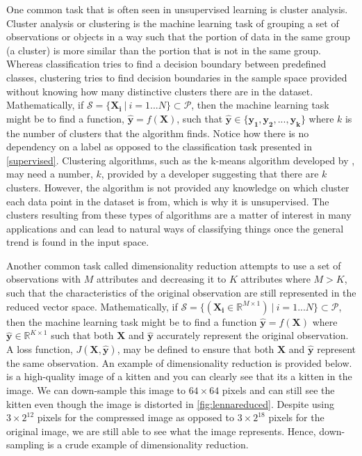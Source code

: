 One common task that is often seen in unsupervised learning is cluster analysis. Cluster analysis or clustering is the machine learning task of grouping a set of observations or objects in a way such that the portion of data in the same group (a cluster) is more similar than the portion that is not in the same group. Whereas classification tries to find a decision boundary between predefined classes, clustering tries to find decision boundaries in the sample space provided without knowing how many distinctive clusters there are in the dataset. Mathematically, if $\mathcal{S} =\{  \mathbf{X_i} \ | \ i = 1...N\} \subset \mathcal{P}$, then the machine learning task might be to find a function, $\mathbf{\hat{y}} = f(\mathbf{X})$, such that $\mathbf{\hat{y}} \in \{\mathbf{y_1}, \mathbf{y_2}, ...,\mathbf{y_k}\}$ where $k$ is the number of clusters that the algorithm finds. Notice how there is no dependency on a label as opposed to the classification task presented in \cref{supervised}. Clustering algorithms, such as the k-means algorithm developed by \citet{macqueen1967some}, may need a number, $k$, provided by a developer suggesting that there are $k$ clusters. However, the algorithm is not provided any knowledge on which cluster each data point in the dataset is from, which is why it is unsupervised. The clusters resulting from these types of algorithms are a matter of interest in many applications and can lead to natural ways of classifying things once the general trend is found in the input space.  

Another common task called dimensionality reduction attempts to use a set of observations with $M$ attributes and decreasing it to $K$ attributes where $M > K$, such that the characteristics of the original observation are still represented in the reduced vector space.  Mathematically, if $\mathcal{S} =\{ ( \mathbf{X_i} \in \mathbb{R}^{M\times1} ) \ | \ i = 1...N\} \subset \mathcal{P}$, then the machine learning task might be to find a function $\mathbf{\hat{y}} = f(\mathbf{X})$ where $\mathbf{\hat{y}} \in \mathbb{R}^{K \times 1}$ such that both $\mathbf{X}$ and $\mathbf{\hat{y}}$ accurately represent the original observation. A loss function, $J(\mathbf{X}, \mathbf{\hat{y}})$, may be defined to ensure that both $\mathbf{X}$ and $\mathbf{\hat{y}}$ represent the same observation. An example of dimensionality reduction is provided below.  is a high-quality image of a kitten and you can clearly see that its a kitten in the image. We can down-sample this image to $64\times64$ pixels and can still see the kitten even though the image is distorted in \cref{fig:lennareduced}. Despite using $3 \times 2^{12}$ pixels for the compressed image as opposed to $3 \times 2^{18}$ pixels for the original image, we are still able to see what the image represents. Hence, down-sampling is a crude example of dimensionality reduction. 

